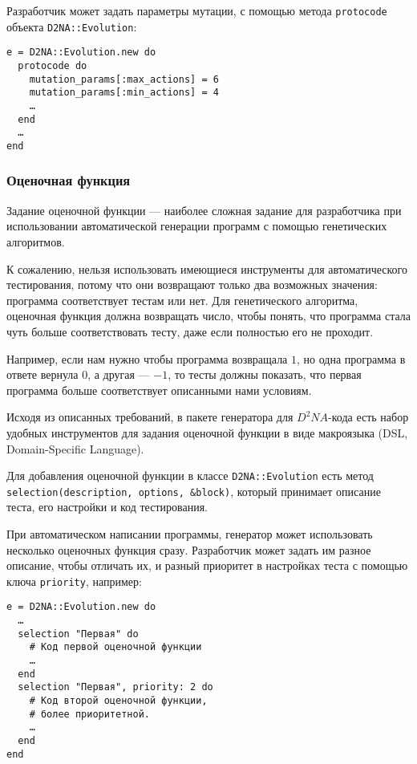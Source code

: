 \documentclass[utf8,a5paper,portrait,10pt]{eskdtext}
\begin{document}
Разработчик может задать параметры мутации, с помощью метода \texttt{protocode}
объекта \texttt{D2NA::Evolution}:

\begin{verbatim}
e = D2NA::Evolution.new do
  protocode do
    mutation_params[:max_actions] = 6
    mutation_params[:min_actions] = 4
    …
  end
  …
end
\end{verbatim}

\subsubsection{Оценочная функция}

Задание оценочной функции — наиболее сложная задание для разработчика при
использовании автоматической генерации программ с помощью генетических
алгоритмов.

К сожалению, нельзя использовать имеющиеся инструменты для автоматического
тестирования, потому что они возвращают только два возможных значения: программа
соответствует тестам или нет. Для генетического алгоритма, оценочная функция
должна возвращать число, чтобы понять, что программа стала чуть больше 
соответствовать тесту, даже если полностью его не проходит.

Например, если нам нужно чтобы программа возвращала $1$, но одна программа в
ответе вернула $0$, а другая — $-1$, то тесты должны показать, что первая
программа больше соответствует описанными нами условиям.

Исходя из описанных требований, в пакете генератора для $D^2NA$-кода есть набор
удобных инструментов для задания оценочной функции в виде макроязыка (DSL,
Domain-Specific Language).

Для добавления оценочной функции в классе \texttt{D2NA::Evolution} есть метод
\texttt{selection(description, options, \&block)}, который принимает описание
теста, его настройки и код тестирования.

При автоматическом написании программы, генератор может использовать несколько
оценочных функция сразу. Разработчик может задать им разное описание, чтобы
отличать их, и разный приоритет в настройках теста с помощью ключа
\texttt{priority}, например:

\begin{verbatim}
e = D2NA::Evolution.new do
  …
  selection "Первая" do
    # Код первой оценочной функции
    …
  end
  selection "Первая", priority: 2 do
    # Код второй оценочной функции,
    # более приоритетной.
    …
  end
end
\end{verbatim}
\end{document}
